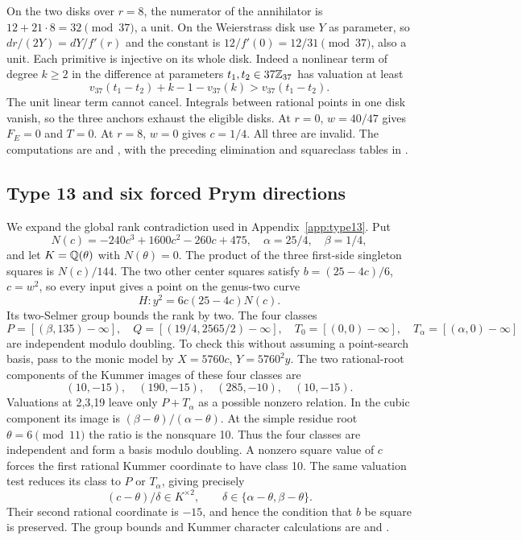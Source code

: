 On the two disks over $r=8$, the numerator of the annihilator is
$12+21\cdot8=32\pmod{37}$, a unit. On the Weierstrass disk use $Y$
as parameter, so $dr/(2Y)=dY/f'(r)$ and the constant is
$12/f'(0)=12/31\pmod{37}$, also a unit. Each primitive is injective
on its whole disk. Indeed a nonlinear term of degree $k\geq2$
in the difference at parameters $t_1,t_2\in37\mathbb Z_{37}$ has
valuation at least
\[
 v_{37}(t_1-t_2)+k-1-v_{37}(k)>v_{37}(t_1-t_2).
\]
The unit linear term cannot cancel. Integrals between rational points
in one disk vanish, so the three anchors exhaust the eligible disks.
At $r=0$, $w=40/47$ gives $F_E=0$ and $T=0$. At $r=8$, $w=0$
gives $c=1/4$. All three are invalid. The computations are
 and
, with the preceding elimination
and squareclass tables in .

\subsection{Type 13 and six forced Prym directions}\label{app:type13-details}

We expand the global rank contradiction used in
Appendix~\ref{app:type13}. Put
\[
 N(c)=-240c^3+1600c^2-260c+475,\quad
 \alpha=25/4,\quad\beta=1/4,
\]
and let $K=\mathbb Q(\theta)$ with $N(\theta)=0$. The product of
the three first-side singleton squares is $N(c)/144$. The two other
center squares satisfy $b=(25-4c)/6$, $c=w^2$, so every input gives
a point on the genus-two curve
\[
 H:y^2=6c(25-4c)N(c).
\]
Its two-Selmer group bounds the rank by two. The four classes
\[
 P=[(\beta,135)-\infty],\quad
 Q=[(19/4,2565/2)-\infty],\quad
 T_0=[(0,0)-\infty],\quad T_\alpha=[(\alpha,0)-\infty]
\]
are independent modulo doubling. To check this without assuming a
point-search basis, pass to the monic model by $X=5760c$,
$Y=5760^2y$. The two rational-root components of the Kummer images
of these four classes are
\[
 (10,-15),\quad(190,-15),\quad(285,-10),\quad(10,-15).
\]
Valuations at 2,3,19 leave only $P+T_\alpha$ as a possible nonzero
relation. In the cubic component its image is
$(\beta-\theta)/(\alpha-\theta)$. At the simple residue root
$\theta=6\pmod{11}$ the ratio is the nonsquare 10. Thus the four
classes are independent and form a basis modulo doubling. A nonzero
square value of $c$ forces the first rational Kummer coordinate to
have class 10. The same valuation test reduces its class to
$P$ or $T_\alpha$, giving precisely
\begin{equation}\label{eq:md13-twists}
 (c-\theta)/\delta\in K^{\times2},\qquad
          \delta\in\{\alpha-\theta,\beta-\theta\}.
\end{equation}
Their second rational coordinate is $-15$, and hence the condition
that $b$ be square is preserved. The group bounds and Kummer character
calculations are  and
.

